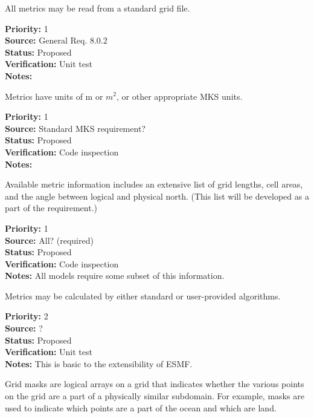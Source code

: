 All metrics may be read from a standard grid file.
\begin{reqlist}
{\bf Priority:} 1 \\
{\bf Source:} General Req. 8.0.2 \\
{\bf Status:} Proposed \\
{\bf Verification:} Unit test\\
{\bf Notes:} 
\end{reqlist}

Metrics have units of m or $m^2$, or other appropriate MKS units.
\begin{reqlist}
{\bf Priority:} 1 \\
{\bf Source:} Standard MKS requirement? \\
{\bf Status:} Proposed \\
{\bf Verification:} Code inspection \\
{\bf Notes:} 
\end{reqlist}

Available metric information includes an extensive list of grid lengths, cell
areas, and the angle between logical and physical north.  (This list will be
developed as a part of the requirement.)
\begin{reqlist}
{\bf Priority:} 1 \\
{\bf Source:} All? (required) \\
{\bf Status:} Proposed \\
{\bf Verification:} Code inspection \\
{\bf Notes:} All models require some subset of this information.
\end{reqlist}

Metrics may be calculated by either standard or user-provided algorithms. 
\begin{reqlist}
{\bf Priority:} 2 \\
{\bf Source:} ? \\
{\bf Status:} Proposed \\
{\bf Verification:} Unit test \\
{\bf Notes:} This is basic to the extensibility of ESMF. 
\end{reqlist}


Grid masks are logical arrays on a grid that indicates whether the various
points on the grid are a part of a physically similar subdomain. For example,
masks are used to indicate which points are a part of the ocean and which are
land.

